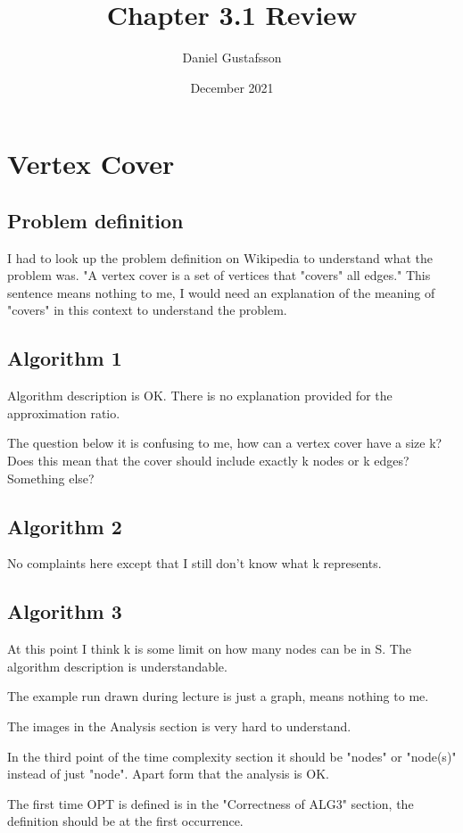 \documentclass[11pt, a4paper]{article}
\title{Chapter 3.1 Review}
\author{Daniel Gustafsson}
\date{December 2021}
\begin{document}
\maketitle

\section{Vertex Cover}
\subsection{Problem definition}
I had to look up the problem definition on Wikipedia to understand what the problem was.
"A vertex cover is a set of vertices that "covers" all edges." This sentence means nothing to me,
I would need an explanation of the meaning of "covers" in this context to understand the problem.

\subsection{Algorithm 1}
Algorithm description is OK. There is no explanation provided for the approximation ratio. 

The question below it is confusing to me, how can a vertex cover
have a size k? Does this mean that the cover should include exactly k nodes or k edges? Something else?

\subsection{Algorithm 2}
No complaints here except that I still don't know what k represents.

\subsection{Algorithm 3}
At this point I think k is some limit on how many nodes can be in S.
The algorithm description is understandable.

The example run drawn during lecture is just a graph, means nothing to me.

The images in the Analysis section is very hard to understand.

In the third point of the time complexity section it should be "nodes" or "node(s)" instead of just "node".
Apart form that the analysis is OK.

The first time OPT is defined is in the "Correctness of ALG3" section, the definition should be at the first
occurrence.
\end{document}
